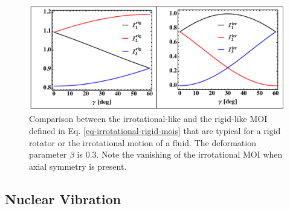 \begin{figure}
    \centering
    \includegraphics[scale=0.51]{Chapters/Figures/mois_rig_irr.pdf}
    \caption{Comparison between the irrotational-like and the rigid-like MOI defined in Eq. \ref{eq-irrotational-rigid-mois} that are typical for a rigid rotator or the irrotational motion of a fluid. The deformation parameter $\beta$ is $0.3$. Note the vanishing of the irrotational MOI when axial symmetry is present.}
    \label{fig-irrotational-rigid-mois}
\end{figure}

\subsection{Nuclear Vibration}

